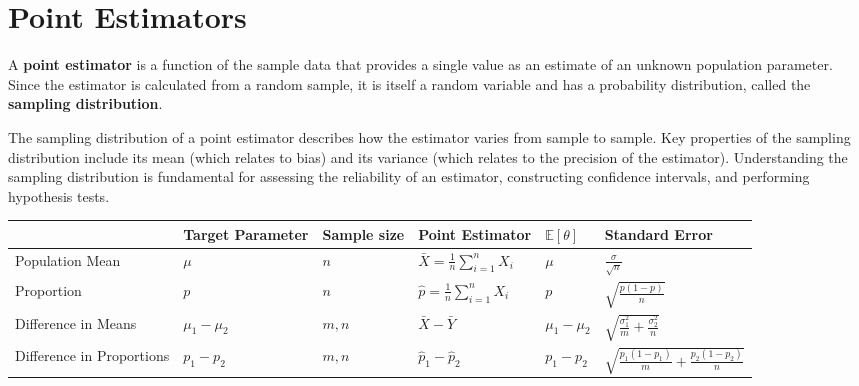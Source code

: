 \section{Point Estimators}
A \textbf{point estimator} is a function of the sample data that provides a single value as an estimate of an unknown population parameter. Since the estimator is calculated from a random sample, it is itself a random variable and has a probability distribution, called the \textbf{sampling distribution}.

The sampling distribution of a point estimator describes how the estimator varies from sample to sample. Key properties of the sampling distribution include its mean (which relates to bias) and its variance (which relates to the precision of the estimator). Understanding the sampling distribution is fundamental for assessing the reliability of an estimator, constructing confidence intervals, and performing hypothesis tests.

\begin{table}[h!]
\renewcommand{\arraystretch}{1.2}
\begin{tabularx}{\textwidth}{p{2.5cm}|l|l|X|l|X}
    & Target Parameter & Sample size & Point Estimator & $\mathbb{E}[\theta]$ & Standard Error \\
    \hline
    Population Mean & $\mu$ & $n$ & $\bar{X} = \frac{1}{n}\sum_{i=1}^n X_i$ & $\mu$ & $\frac{\sigma}{\sqrt{n}}$ \\
    Proportion & $p$ & $n$ & $\hat{p} = \frac{1}{n}\sum_{i=1}^n X_i$ & $p$ & $\sqrt{\frac{p(1-p)}{n}}$ \\
    Difference in Means & $\mu_1 - \mu_2$ & $m, n$ & $\bar{X} - \bar{Y}$ & $\mu_1 - \mu_2$ & $\sqrt{\frac{\sigma_1^2}{m} + \frac{\sigma_2^2}{n}}$ \\
    Difference in Proportions & $p_1 - p_2$ & $m, n$ & $\hat{p}_1 - \hat{p}_2$ & $p_1 - p_2$ & $\sqrt{\frac{p_1(1-p_1)}{m} + \frac{p_2(1-p_2)}{n}}$ \\
    \hline
\end{tabularx}
\end{table}

